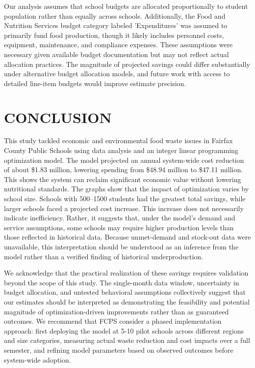 \documentclass[journal]{IEEEtran}
\begin{document}
Our analysis assumes that school budgets are allocated proportionally to student population rather than equally across schools. Additionally, the Food and Nutrition Services budget category labeled 'Expenditures' was assumed to primarily fund food production, though it likely includes personnel costs, equipment, maintenance, and compliance expenses. These assumptions were necessary given available budget documentation but may not reflect actual allocation practices. The magnitude of projected savings could differ substantially under alternative budget allocation models, and future work with access to detailed line-item budgets would improve estimate precision.


\section{CONCLUSION}

This study tackled economic and environmental food waste issues in Fairfax County Public Schools using data analysis and an integer linear programming optimization model. The model projected an annual system-wide cost reduction of about \$1.83 million, lowering spending from \$48.94 million to \$47.11 million. This shows the system can reclaim significant economic value without lowering nutritional standards. The graphs show that the impact of optimization varies by school size. Schools with 500–1500 students had the greatest total savings, while larger schools faced a projected cost increase. This increase does not necessarily indicate inefficiency. Rather, it suggests that, under the model’s demand and service assumptions, some schools may require higher production levels than those reflected in historical data. Because unmet-demand and stock-out data were unavailable, this interpretation should be understood as an inference from the model rather than a verified finding of historical underproduction.

We acknowledge that the practical realization of these savings requires validation beyond the scope of this study. The single-month data window, uncertainty in budget allocation, and untested behavioral assumptions collectively suggest that our estimates should be interpreted as demonstrating the feasibility and potential magnitude of optimization-driven improvements rather than as guaranteed outcomes. We recommend that FCPS consider a phased implementation approach: first deploying the model at 5-10 pilot schools across different regions and size categories, measuring actual waste reduction and cost impacts over a full semester, and refining model parameters based on observed outcomes before system-wide adoption.
\end{document}
